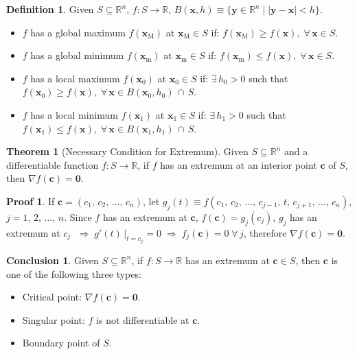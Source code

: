 \documentclass[12pt]{extarticle}
\newcommand{\ds}{\displaystyle}
\newcommand{\ie}{\;\Longrightarrow\;}
\theoremstyle{definition}
\newtheorem*{dfn}{Definition}
\newtheorem*{fact}{Conclusion}
\newtheorem*{thm}{Theorem}
\newtheorem*{prf}{Proof}
\newcommand{\vc}{\mathbf{c}}
\newcommand{\vx}{\mathbf{x}}
\newcommand{\vy}{\mathbf{y}}
\newcommand{\vZero}{\mathbf{0}}
\begin{document}
\begin{dfn}
  Given $\ds S\subseteq\mathbb{R}^n$, $\ds f:S\to\mathbb{R}$, $\ds B(\vx, h)\equiv\{\vy\in\mathbb{R}^n\;|\;|\vy - \vx| < h\}$. 
  \begin{itemize}\setlength\itemsep{0em}
    \item $f$ has a global maximum $\ds f(\vx_\text{M})$ at $\ds\vx_\text{M}\in S$ if: $\ds f(\vx_\text{M})\geqslant f(\vx),\;\forall\,\vx\in S$. 
    \item $f$ has a global minimum $\ds f(\vx_\text{m})$ at $\ds \vx_\text{m}\in S$ if: $\ds f(\vx_\text{m})\leqslant f(\vx),\;\forall\,\vx\in S$. 
    \item $f$ has a local maximum $\ds f(\vx_0)$ at $\ds\vx_0\in S$ if: $\ds\exists\,h_0 > 0$ such that $\ds f(\vx_0)\geqslant f(\vx),\;\forall\,\vx\in B(\vx_0, h_0)\,\cap\,S$. 
    \item $f$ has a local minimum $\ds f(\vx_1)$ at $\ds\vx_1\in S$ if: $\ds\exists\,h_1 > 0$ such that $\ds f(\vx_1)\leqslant f(\vx),\;\forall\,\vx\in B(\vx_1, h_1)\,\cap\,S$. 
  \end{itemize}
\end{dfn}

\begin{thm}[Necessary Condition for Extremum]
  Given $\ds S\subseteq\mathbb{R}^n$ and a differentiable function $\ds f:S\to\mathbb{R}$, if $f$ has an extremum at an interior point $\vc$ of $S$, then $\ds\nabla f(\vc) = \vZero$. 
\end{thm}

\begin{prf}
  If $\ds\vc = (c_1,\,c_2,\,\ldots,\,c_n)$, let $\ds g_j(t)\equiv f(c_1,\,c_2,\,\ldots,\,c_{j - 1},\,t,\,c_{j + 1},\,\ldots,\,c_n)$, $j = 1,\,2,\,\ldots,\,n$. Since $f$ has an extremum at $\vc$, $f(\vc) = g_j(c_j)$, $g_j$ has an extremum at $c_j$ $\ie g'(t)\,\big|_{t = c_j} = 0 \ie f_j(\vc) = 0\;\forall\,j$, therefore $\ds\nabla f(\vc) = \vZero$.  
\end{prf}

\begin{fact}
  Given $\ds S\subseteq\mathbb{R}^n$, if $f:S\to\mathbb{R}$ has an extremum at $\vc\in S$, then $\vc$ is one of the following three types: 
  \begin{multicols}{2}
    \begin{itemize}\setlength\itemsep{0em}
      \item Critical point: $\ds \nabla f(\vc) = \vZero$. 
      \item Singular point: $f$ is not differentiable at $\vc$.  
      \item Boundary point of $S$. 
    \end{itemize}
  \end{multicols}
\end{fact}
\end{document}
